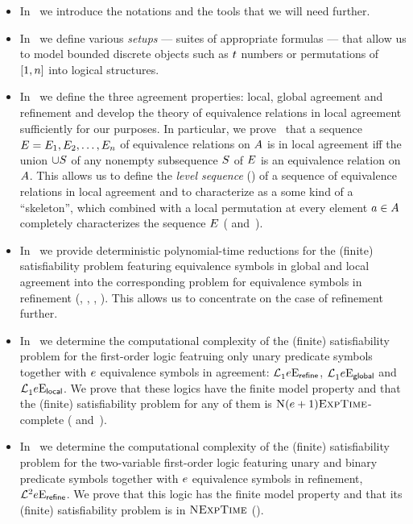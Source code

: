 \begin{itemize}
  \item
  In~ we introduce the notations and the tools that we will
  need further.
  
  \item
  In~ we define various \emph{setups} --- suites of appropriate
  formulas --- that allow us to model bounded discrete objects such as $t$
  numbers or permutations of $[1,n]$ into logical structures.

  \item
  In~ we define the three agreement properties: local,
  global agreement and refinement and develop the theory of equivalence
  relations in local agreement sufficiently for our purposes.
  In particular, we prove~ that a sequence $E =
  E_{1},E_{2},\dots,E_{n}$ of equivalence relations on $A$ is in
  local agreement iff the union $\cup S$ of any nonempty subsequence $S$
  of $E$ is an equivalence relation on $A$.
  This allows us to define the \emph{level sequence} () of a
  sequence of equivalence relations in local agreement and to characterize as a
  some kind of a ``skeleton'', which combined with a local permutation at every
  element $a\in A$ completely characterizes the sequence $E$
  ( and~).
  
  \item
  In~ we provide deterministic polynomial-time reductions
  for the (finite) satisfiability problem featuring equivalence symbols in
  global and local agreement into the corresponding problem for equivalence
  symbols in refinement (,
  , ,
  ).
  This allows us to concentrate on the case of refinement further.
  
  \item
  In~ we determine the computational complexity of the
  (finite) satisfiability problem for the first-order logic featruing only unary
  predicate symbols together with $e$ equivalence symbols in agreement:
  $\mathcal{L}^{{}}_{1}{e}\mathrm{E}_{\mathsf{refine}}$,
  $\mathcal{L}^{{}}_{1}{e}\mathrm{E}_{\mathsf{global}}$ and 
  $\mathcal{L}^{{}}_{1}{e}\mathrm{E}_{\mathsf{local}}$.
  We prove that these logics have the finite model property and that the
  (finite) satisfiability problem for any of them is
  $\text{\normalfont{\scshape N}}(e+1)\text{\normalfont{\scshape ExpTime}}$-complete (
  and~).
  
  \item
  In~ we determine the computational complexity of the (finite)
  satisfiability problem for the two-variable first-order logic featuring unary
  and binary predicate symbols together with $e$ equivalence symbols in
  refinement,
  $\mathcal{L}^{2}_{{}}{e}\mathrm{E}_{\mathsf{refine}}$.
  We prove that this logic has the finite model property and that its (finite)
  satisfiability problem is in $\text{\normalfont{\scshape NExpTime}}$ ().
\end{itemize}


